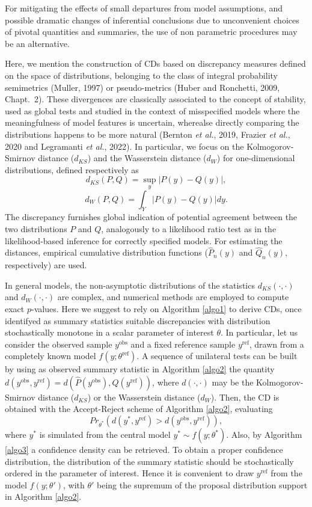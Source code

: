 \documentclass[preprint,12pt,authoryear]{elsarticle}
\begin{document}
For mitigating the effects of small departures from model assumptions, and possible dramatic changes of inferential conclusions due to 
 unconvenient choices of pivotal quantities and summaries, the use of non parametric procedures may be an alternative.
 
 Here, we mention the construction of CDs based on  discrepancy measures defined on the space of distributions, belonging to the class of integral probability semimetrics (Muller, 1997) or pseudo-metrics (Huber and Ronchetti, 2009, Chapt.\ 2). These divergences are classically associated to the concept of stability, used as global tests and studied in the context of misspecified models  where the meaningfulness of  model features is uncertain, wherealse directly comparing the distributions happens to be more natural  (Bernton {\em et al.}, 2019, Frazier {\em et al.}, 2020 and Legramanti {\em et al.}, 2022). In particular, we focus on the Kolmogorov-Smirnov distance ($d_{KS}$) and the Wasserstein distance ($d_{W}$) for one-dimensional distributions, defined respectively as 
$$d_{KS}(P,Q)=\underset{y}{\sup} |P(y) - Q(y)|,$$
$$d_{W}(P,Q)=\int_{Y} |P(y) - Q(y)| dy.$$
  The discrepancy  furnishes global indication of potential agreement between the two distributions $P$ and $Q$,  analogously to a likelihood ratio test as in the likelihood-based inference for correctly specified models.
For estimating the distances, empirical cumulative distribution functions  ($\hat P_n(y)$ and $\hat Q_n(y)$, respectively) are used.

In general models, the non-asymptotic distributions of the statistics  $d_{KS}(\cdot, \cdot)$ and $d_{W}(\cdot,\cdot)$ are complex, and numerical methods are employed to compute exact $p$-values.  Here we suggest to rely on Algorithm \ref{algo1}  to derive CDs, once identifyed as  summary statistics suitable discrepancies with distribution stochastically  monotone in a scalar parameter of interest $\theta$. In particular, let us consider  the observed sample $y^{\text{obs}}$  and a fixed reference sample $y^{\text{ref}}$, drawn from a completely known model $f(y;\theta^{\text{ref}})$.
A sequence of unilateral tests can be built by using as observed summary statistic in Algorithm \ref{algo2} the quantity
 $d(y^{\text{obs}},y^{\text{ref}})=d(\hat P(y^{\text{obs}}),\hat Q(y^{\text{ref}}))$, where $d(\cdot,\cdot)$ may be the Kolmogorov-Smirnov distance ($d_{KS}$) or the Wasserstein distance ($d_{W}$).
Then, the CD is obtained with the Accept-Reject scheme of  Algorithm \ref{algo2}, evaluating 
$$
Pr_{\theta^*} (d(y^*,y^{\text{ref}})> d(y^{\text{obs}},y^{\text{ref}})),
$$
where $y^*$ is simulated from the central model  $y^* \sim f(y;\theta^*)$. Also,  by Algorithm \ref{algo3} a confidence density can be retrieved. 
To obtain a proper confidence distribution, the distribution of the summary statistic should be stochastically ordered in the parameter of interest. Hence it is convenient to draw $y^{\text{ref}}$ from the model $f(y;\theta')$,  with    $\theta'$ being the supremum of the proposal distribution  support in Algorithm \ref{algo2}.
\end{document}
